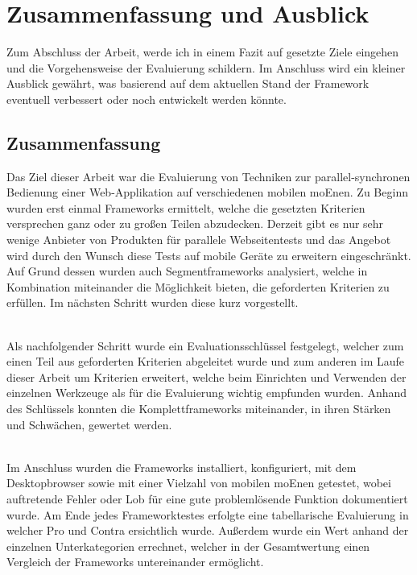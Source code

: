 \chapter{Zusammenfassung und Ausblick}
Zum Abschluss der Arbeit, werde ich in einem Fazit auf gesetzte Ziele eingehen und die Vorgehensweise der Evaluierung schildern. Im Anschluss wird ein kleiner Ausblick gewährt, was basierend auf dem aktuellen Stand der \Gls{Framework} eventuell verbessert oder noch entwickelt werden könnte.

\section{Zusammenfassung}
Das Ziel dieser Arbeit war die Evaluierung von Techniken zur
parallel-synchronen Bedienung einer
Web-Applikation auf verschiedenen
mobilen \Gls{moEn}en. Zu Beginn wurden erst einmal \Gls{Framework}s ermittelt, welche die gesetzten Kriterien versprechen ganz oder zu großen Teilen abzudecken. 
Derzeit gibt es nur sehr wenige Anbieter von Produkten für parallele Webseitentests und das Angebot wird durch den Wunsch diese Tests auf mobile Geräte zu erweitern eingeschränkt. Auf Grund dessen wurden auch Segmentframeworks analysiert, welche in Kombination miteinander die Möglichkeit bieten, die geforderten Kriterien zu erfüllen. Im nächsten Schritt wurden diese kurz vorgestellt.

\\Als nachfolgender Schritt wurde ein Evaluationsschlüssel festgelegt, welcher zum einen Teil aus geforderten Kriterien abgeleitet wurde und zum anderen im Laufe dieser Arbeit um Kriterien erweitert, welche beim Einrichten und Verwenden der einzelnen Werkzeuge als für die Evaluierung wichtig empfunden wurden. Anhand des Schlüssels konnten die Komplettframeworks miteinander, in ihren Stärken und Schwächen, gewertet werden.

\\Im Anschluss wurden die \Gls{Framework}s installiert, konfiguriert, mit dem Desktopbrowser sowie mit einer Vielzahl von mobilen \Gls{moEn}en getestet, wobei auftretende Fehler oder Lob für eine gute problemlösende Funktion dokumentiert wurde. Am Ende jedes \Gls{Framework}testes erfolgte eine tabellarische Evaluierung in welcher Pro und Contra ersichtlich wurde. Außerdem wurde ein Wert anhand der einzelnen Unterkategorien errechnet, welcher in der Gesamtwertung einen Vergleich der \Gls{Framework}s untereinander ermöglicht.

